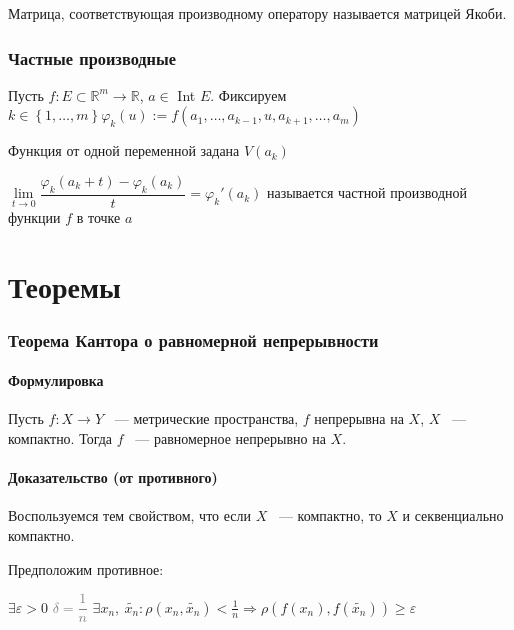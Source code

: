 \documentclass{article}
\begin{document}
            Матрица, соответствующая производному оператору называется матрицей Якоби.
            
    \newpage
    
    \section{Частные производные}
    
        Пусть $f : E \subset \mathbb{R}^m \rightarrow \mathbb{R}$, $a \in$ Int $E$. Фиксируем $k \in \left\{ 1, \ldots, m \right\} \varphi_k(u) := f(a_1, \ldots, a_{k - 1}, u, a_{k + 1}, \ldots, a_m)$
        
        Функция от одной переменной задана $V(a_k)$
        
        $\lim\limits_{t \rightarrow 0} \dfrac{\varphi_k(a_k + t) - \varphi_k(a_k)}{t} = \varphi_k'(a_k)$ называется частной производной функции $f$ в точке $a$
        
        
        
\newpage
	
\part{Теоремы}

	\newpage
	
	\section{Теорема Кантора о равномерной непрерывности}
	
        \subsection{Формулировка}
        
            Пусть $f: X \rightarrow Y$ ~--- метрические пространства, $f$ непрерывна на $X$, $X$ ~--- компактно. Тогда $f$ ~--- равномерное непрерывно на $X$.
		
		\subsection{Доказательство (от противного)}
		
			Воспользуемся тем свойством, что если $X$ ~--- компактно, то $X$ и секвенциально компактно.
			
			Предположим противное:
			
			$\exists \varepsilon > 0$ \textcolor{gray}{$\delta = \dfrac{1}{n}$} $\exists x_n, \ \widetilde{x_n} : \rho(x_n, \widetilde{x_n}) < \frac{1}{n} \Rightarrow \rho(f(x_n), f(\widetilde{x_n})) \geq \varepsilon$
			
\end{document}
